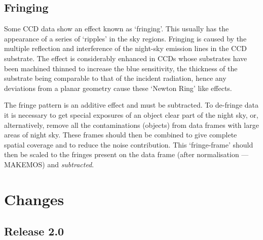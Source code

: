 \documentclass[twoside,11pt]{article}
\newcommand{\htmlref}[2]{#1}
\newcommand{\xlabel}[1]{}
\renewcommand{\_}{\texttt{\symbol{95}}}
\newcommand{\xroutine}[1]{\htmlref{{\sc #1}}{#1}}
\begin{document}
\subsection{Fringing\xlabel{CCDglosfringing}}
Some CCD data show an effect known as `fringing'. This usually has the
appearance of a series of `ripples' in the sky regions. Fringing is
caused by the multiple reflection and interference of the night-sky
emission lines in the CCD substrate. The effect is considerably enhanced
in CCDs whose substrates have been machined thinned to increase the blue
sensitivity, the thickness of the substrate being comparable to that of
the incident radiation, hence any deviations from a planar geometry
cause these `Newton Ring' like effects.

The fringe pattern is an additive effect and must be subtracted. To
de-fringe data it is necessary to get special exposures of an object
clear part of the night sky, or, alternatively, remove all the
contaminations (objects) from data frames with large areas of night sky.
These frames should then be combined to give complete spatial coverage
and to reduce the noise contribution. This `fringe-frame' should then be
scaled to the fringes present on the data frame (after normalisation
--- \xroutine{MAKEMOS}) and {\em subtracted}.

\newpage
\section{Changes}
\subsection{Release 2.0}
\end{document}
